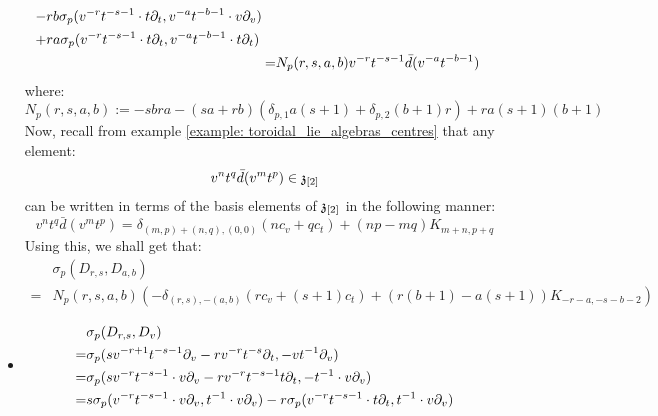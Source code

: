 \begin{example}
\begin{itemize}
$$\begin{aligned}
\begin{aligned}
                                \\
                                - & r b \sigma_p( v^{-r} t^{-s - 1} \cdot t \del_t, v^{-a} t^{-b - 1} \cdot v\del_v )
                                \\
                                + & r a \sigma_p( v^{-r} t^{-s - 1} \cdot t \del_t, v^{-a} t^{-b - 1} \cdot t \del_t )
                            \end{aligned}
                            \\
                            = & N_p(r, s, a, b) v^{-r} t^{-s - 1} \bar{d}( v^{-a} t^{-b - 1} )
                        \end{aligned}
                    $$
                where:
                    $$N_p(r, s, a, b) := -s b r a - (sa + rb) (\delta_{p, 1} a (s + 1) + \delta_{p, 2} (b + 1) r ) + r a (s + 1) (b + 1)$$
                Now, recall from example \ref{example: toroidal_lie_algebras_centres} that any element:
                    $$v^n t^q \bar{d}(v^m t^p) \in \z_{[2]}$$
                can be written in terms of the basis elements of $\z_{[2]}$ in the following manner:
                    $$v^n t^q \bar{d}(v^m t^p) = \delta_{(m, p) + (n, q), (0, 0)} ( n c_v + q c_t ) + (np - mq) K_{m + n, p + q}$$
                Using this, we shall get that:
                    $$
                        \begin{aligned}
                            & \sigma_p(D_{r, s}, D_{a, b})
                            \\
                            = & N_p(r, s, a, b) \left( -\delta_{(r, s), -(a, b)} (r c_v + (s + 1) c_t) + ( r(b + 1) - a(s + 1) )K_{-r - a, -s - b - 2} \right)
                        \end{aligned}
                    $$
                \item
                    $$
                        \begin{aligned}
                            & \sigma_p(D_{r, s}, D_v)
                            \\
                            = & \sigma_p( s v^{-r + 1} t^{-s - 1} \del_v - r v^{-r} t^{-s} \del_t, -v t^{-1} \del_v )
                            \\
                            = & \sigma_p( s v^{-r} t^{-s - 1} \cdot v \del_v - r v^{-r} t^{-s - 1} t \del_t, -t^{-1} \cdot v \del_v )
                            \\
                            = & s \sigma_p( v^{-r} t^{-s - 1} \cdot v \del_v, t^{-1} \cdot v \del_v ) - r\sigma_p( v^{-r} t^{-s - 1} \cdot t \del_t, t^{-1} \cdot v \del_v )

\end{aligned}$$
\end{itemize}
\end{example}
